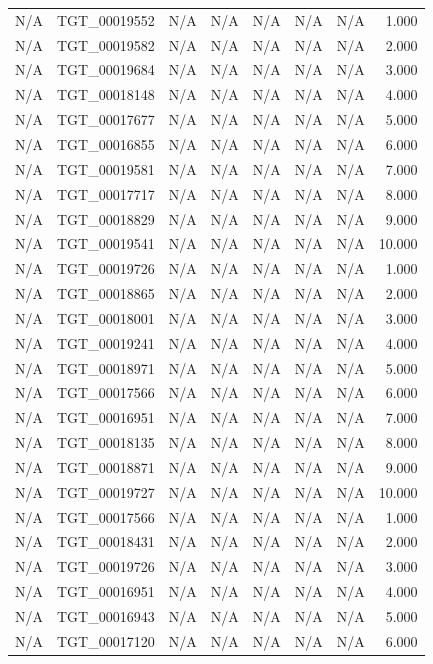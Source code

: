\begin{table}[h!]
\begin{tabular}{lrrrrrrr}
N/A & TGT\_00019552 & N/A & N/A & N/A & N/A & N/A & 1.000 \\
N/A & TGT\_00019582 & N/A & N/A & N/A & N/A & N/A & 2.000 \\
N/A & TGT\_00019684 & N/A & N/A & N/A & N/A & N/A & 3.000 \\
N/A & TGT\_00018148 & N/A & N/A & N/A & N/A & N/A & 4.000 \\
N/A & TGT\_00017677 & N/A & N/A & N/A & N/A & N/A & 5.000 \\
N/A & TGT\_00016855 & N/A & N/A & N/A & N/A & N/A & 6.000 \\
N/A & TGT\_00019581 & N/A & N/A & N/A & N/A & N/A & 7.000 \\
N/A & TGT\_00017717 & N/A & N/A & N/A & N/A & N/A & 8.000 \\
N/A & TGT\_00018829 & N/A & N/A & N/A & N/A & N/A & 9.000 \\
N/A & TGT\_00019541 & N/A & N/A & N/A & N/A & N/A & 10.000 \\
N/A & TGT\_00019726 & N/A & N/A & N/A & N/A & N/A & 1.000 \\
N/A & TGT\_00018865 & N/A & N/A & N/A & N/A & N/A & 2.000 \\
N/A & TGT\_00018001 & N/A & N/A & N/A & N/A & N/A & 3.000 \\
N/A & TGT\_00019241 & N/A & N/A & N/A & N/A & N/A & 4.000 \\
N/A & TGT\_00018971 & N/A & N/A & N/A & N/A & N/A & 5.000 \\
N/A & TGT\_00017566 & N/A & N/A & N/A & N/A & N/A & 6.000 \\
N/A & TGT\_00016951 & N/A & N/A & N/A & N/A & N/A & 7.000 \\
N/A & TGT\_00018135 & N/A & N/A & N/A & N/A & N/A & 8.000 \\
N/A & TGT\_00018871 & N/A & N/A & N/A & N/A & N/A & 9.000 \\
N/A & TGT\_00019727 & N/A & N/A & N/A & N/A & N/A & 10.000 \\
N/A & TGT\_00017566 & N/A & N/A & N/A & N/A & N/A & 1.000 \\
N/A & TGT\_00018431 & N/A & N/A & N/A & N/A & N/A & 2.000 \\
N/A & TGT\_00019726 & N/A & N/A & N/A & N/A & N/A & 3.000 \\
N/A & TGT\_00016951 & N/A & N/A & N/A & N/A & N/A & 4.000 \\
N/A & TGT\_00016943 & N/A & N/A & N/A & N/A & N/A & 5.000 \\
N/A & TGT\_00017120 & N/A & N/A & N/A & N/A & N/A & 6.000 \\

\end{tabular}
\end{table}
